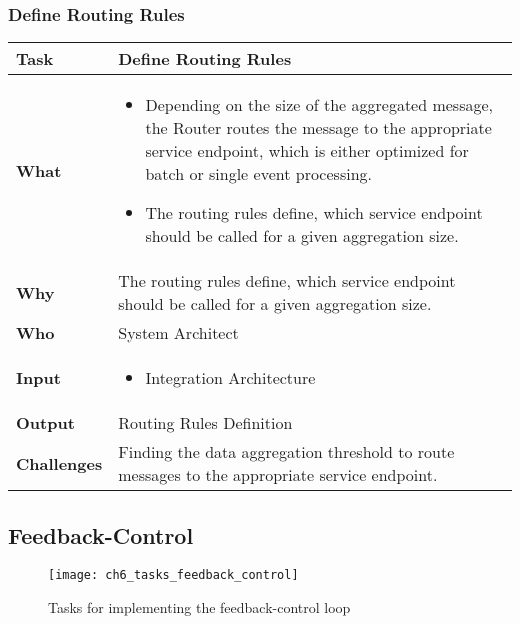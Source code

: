 \subsubsection{Define Routing Rules}
\begin{minipage}{\textwidth}
 \label{table:ch6_Task_Define_Routing_Rules}
\begin{tabular}
	{|m{3cm}|m{10cm}|} \hline \bfseries Task & Define Routing Rules\\
	\hline \bfseries What & 
	\begin{itemize}
		\item Depending on the size of the aggregated message, the Router routes the message to the appropriate service endpoint, which is either optimized for batch or single event processing.
		\item The routing rules define, which service endpoint should be called for a given aggregation size.
	\end{itemize}
	\\
	\hline \bfseries Why & The routing rules define, which service endpoint should be called for a given aggregation size.\\
	\hline \bfseries Who & System Architect\\
	\hline \bfseries Input & 
		\begin{itemize}
			\item Integration Architecture
		\end{itemize}
	\\
	\hline \bfseries Output & Routing Rules Definition\\
	\hline \bfseries Challenges & Finding the data aggregation threshold to route messages to the appropriate service endpoint.\\
	\hline 
\end{tabular}
\end{minipage}

\subsection{Feedback-Control}

\begin{figure}[htpb] \centering 
	\texttt{[image: ch6\_tasks\_feedback\_control]} 
	\caption{Tasks for implementing the feedback-control loop} 
	\label{fig:ch6_tasks_feedback_control} 
\end{figure}

